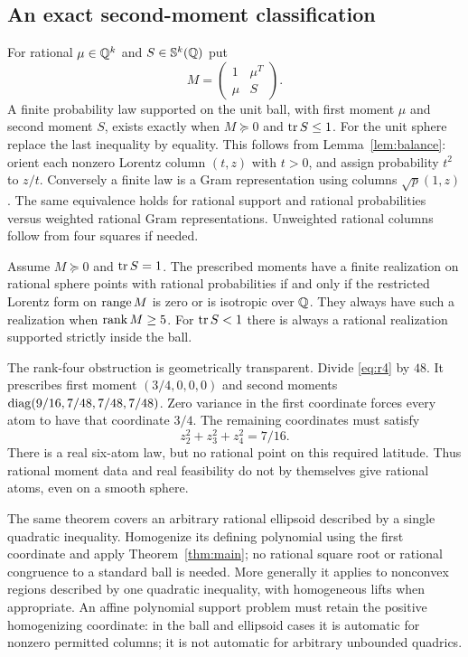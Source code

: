 \subsection{An exact second-moment classification}
For rational $\mu\in\mathbb Q^k$ and $S\in\mathbb S^k(\mathbb Q)$ put
\[
 M=\begin{pmatrix}1&\mu^T\\\mu&S\end{pmatrix}.
\]
A finite probability law supported on the unit ball, with first moment $\mu$ and second moment $S$, exists exactly when $M\succeq0$ and $\operatorname{tr} S\leq1$. For the unit sphere replace the last inequality by equality. This follows from Lemma~\ref{lem:balance}: orient each nonzero Lorentz column $(t,z)$ with $t>0$, and assign probability $t^2$ to $z/t$. Conversely a finite law is a Gram representation using columns $\sqrt p(1,z)$. The same equivalence holds for rational support and rational probabilities versus weighted rational Gram representations. Unweighted rational columns follow from four squares if needed.

\begin{corollary}\label{cor:sphere}
Assume $M\succeq0$ and $\operatorname{tr} S=1$. The prescribed moments have a finite realization on rational sphere points with rational probabilities if and only if the restricted Lorentz form on $\operatorname{range} M$ is zero or is isotropic over $\mathbb Q$. They always have such a realization when $\operatorname{rank} M\geq5$. For $\operatorname{tr} S<1$ there is always a rational realization supported strictly inside the ball.
\end{corollary}
The rank-four obstruction is geometrically transparent. Divide \eqref{eq:r4} by $48$. It prescribes first moment $(3/4,0,0,0)$ and second moments $\operatorname{diag}(9/16,7/48,7/48,7/48)$. Zero variance in the first coordinate forces every atom to have that coordinate $3/4$. The remaining coordinates must satisfy
\[
 z_2^2+z_3^2+z_4^2=7/16.
\]
There is a real six-atom law, but no rational point on this required latitude. Thus rational moment data and real feasibility do not by themselves give rational atoms, even on a smooth sphere.

The same theorem covers an arbitrary rational ellipsoid described by a single quadratic inequality. Homogenize its defining polynomial using the first coordinate and apply Theorem~\ref{thm:main}; no rational square root or rational congruence to a standard ball is needed. More generally it applies to nonconvex regions described by one quadratic inequality, with homogeneous lifts when appropriate. An affine polynomial support problem must retain the positive homogenizing coordinate: in the ball and ellipsoid cases it is automatic for nonzero permitted columns; it is not automatic for arbitrary unbounded quadrics.
